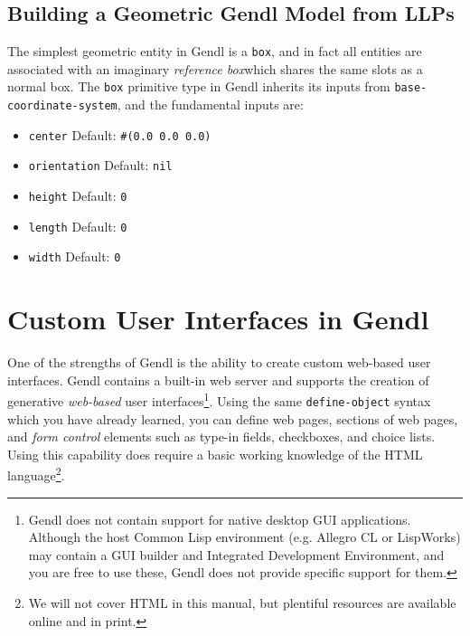\documentclass [11pt]{book}
\begin{document}
\section{Building a Geometric Gendl Model from LLPs}

\label{sec:buildingageometricgendlmodelfromllps}

The simplest geometric entity in Gendl is a \texttt{box}, and in fact all entities are associated with an imaginary \emph{reference box}which shares the same slots as a normal box. The \texttt{box} primitive type in Gendl inherits its inputs from \texttt{base-coordinate-system}, and the fundamental inputs are:

\begin{itemize}

\item \texttt{center} Default: \texttt{\#(0.0 0.0 0.0)}

\item \texttt{orientation} Default: \texttt{nil}

\item \texttt{height} Default: \texttt{0}

\item \texttt{length} Default: \texttt{0}

\item \texttt{width} Default: \texttt{0}

\end{itemize}



\chapter{Custom User Interfaces in Gendl}

\label{chap:customuserinterfacesingendl}



One of the strengths of Gendl is the ability to create custom
web-based user interfaces. Gendl contains a built-in web server and
supports the creation of generative \emph{web-based} user interfaces\footnote{Gendl does not contain support for native desktop
GUI applications. Although the host Common Lisp
environment (e.g. Allegro CL or LispWorks) may contain a GUI builder
and Integrated Development Environment, and you are free to use these,
Gendl does not provide specific support for them.}. Using the same \texttt{define-object} syntax which you have already learned, you can define web
pages, sections of web pages, and \emph{form control} elements such as type-in fields, checkboxes, and choice
lists. Using this capability does require a basic working knowledge of
the HTML language\footnote{We will not cover HTML in this manual, but
plentiful resources are available online and in print.}.
\end{document}
